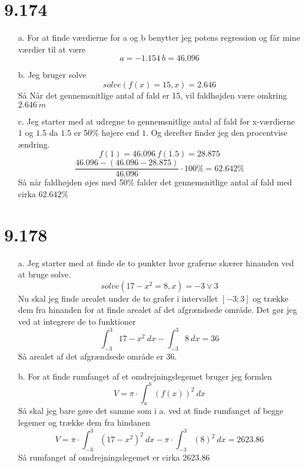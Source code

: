 \documentclass[12pt]{article}
\begin{document}
\section{9.174}
\begin{enumerate}
  \item[a.] For at finde værdierne for a og b benytter jeg potens regression og får mine værdier til at være
  $$a = -1.154 \ b = 46.096$$
  \item[b.] Jeg bruger solve
  $$solve(f(x)=15,x)=2.646$$
  Så Når det gennemsnitlige antal af fald er 15, vil faldhøjden være omkring $2.646 \ m$
  \item[c.] Jeg starter med at udregne to gennemsnitlige antal af fald for x-værdierne $1$ og $1.5$ da $1.5$ er 50\% højere end $1$.
  Og derefter finder jeg den procentvise ændring.
  $$f(1) = 46.096 \ f(1.5) = 28.875$$
  $$\frac{46.096-(46.096-28.875)}{46.096} \cdot 100\%=62.642\%$$
  Så når faldhøjden øjes med 50\% falder det gennemsnitlige antal af fald med cirka 62.642\%
\end{enumerate}

\section{9.178}

\begin{center}
\end{center}

\begin{enumerate}
  \item[a.] Jeg starter med at finde de to punkter hvor graferne skærer hinanden ved at bruge solve.
  $$solve(17-x^2=8, x)=-3 \vee 3$$
  Nu skal jeg finde arealet under de to grafer i intervallet $[-3;3]$ og trække dem fra hinanden for at finde arealet af det afgrændsede område.
  Det gør jeg ved at integrere de to funktioner
  $$\int_{-3}^{3}17-x^2 \ dx- \int_{-3}^{3}8 \ dx=36$$
  Så arealet af det afgrændsede område er 36.

  \item[b.] For at finde rumfanget af et omdrejningslegemet bruger jeg formlen
  $$V=\pi \cdot \int_{a}^{b}(f(x))^2 \ dx$$
  Så skal jeg bare gøre det samme som i a. ved at finde rumfanget af begge legemer og trække dem fra hindanen
  $$V=\pi \cdot \int_{-3}^{3}(17-x^2)^2 \ dx - \pi \cdot \int_{-3}^{3} (8)^2 \ dx = 2623.86$$
  Så rumfanget af omdrejningslegemet er cirka 2623.86
\end{enumerate}
\end{document}

